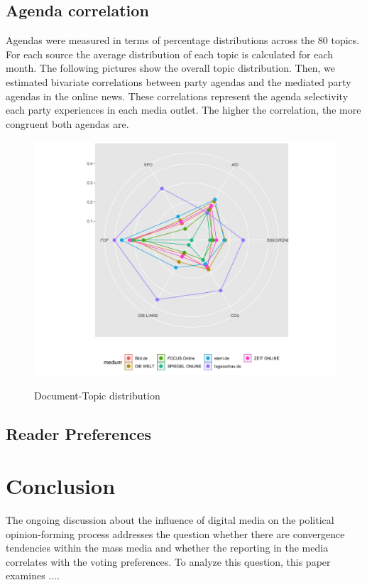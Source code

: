 \documentclass[12pt,a4paper,notitlepage]{article}
\begin{document}
\subsection{Agenda correlation}

Agendas were measured in terms of percentage distributions across the 80 topics. For each source the average distribution of each topic is calculated for each month. The following pictures show the overall topic distribution. Then, we estimated bivariate correlations between party agendas and the mediated party agendas in the online news. These correlations represent the agenda selectivity each party experiences in each media outlet. The higher the correlation, the more congruent both agendas are. 

\begin{figure}[H]
\begin{center}
	\caption{Document-Topic distribution}
	\includegraphics[width=\textwidth]{../figs/radarchart}
	\label{fig_expected_freq}
	\end{center}
\end{figure}

\subsection{Reader Preferences}\label{ch_readerpref}

\section{Conclusion}

The ongoing discussion about the influence of digital media on the political opinion-forming process addresses the question whether there are convergence tendencies within the mass media and whether the reporting in the media correlates with the voting preferences. To analyze this question, this paper examines .... 
\end{document}
